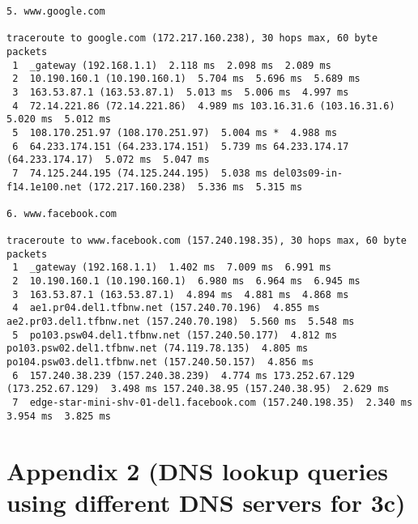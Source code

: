 \documentclass[a4paper]{article}
\begin{document}
\begin{enumerate}
\begin{lstlisting}
5. www.google.com

traceroute to google.com (172.217.160.238), 30 hops max, 60 byte packets
 1  _gateway (192.168.1.1)  2.118 ms  2.098 ms  2.089 ms
 2  10.190.160.1 (10.190.160.1)  5.704 ms  5.696 ms  5.689 ms
 3  163.53.87.1 (163.53.87.1)  5.013 ms  5.006 ms  4.997 ms
 4  72.14.221.86 (72.14.221.86)  4.989 ms 103.16.31.6 (103.16.31.6)  5.020 ms  5.012 ms
 5  108.170.251.97 (108.170.251.97)  5.004 ms *  4.988 ms
 6  64.233.174.151 (64.233.174.151)  5.739 ms 64.233.174.17 (64.233.174.17)  5.072 ms  5.047 ms
 7  74.125.244.195 (74.125.244.195)  5.038 ms del03s09-in-f14.1e100.net (172.217.160.238)  5.336 ms  5.315 ms

6. www.facebook.com

traceroute to www.facebook.com (157.240.198.35), 30 hops max, 60 byte packets
 1  _gateway (192.168.1.1)  1.402 ms  7.009 ms  6.991 ms
 2  10.190.160.1 (10.190.160.1)  6.980 ms  6.964 ms  6.945 ms
 3  163.53.87.1 (163.53.87.1)  4.894 ms  4.881 ms  4.868 ms
 4  ae1.pr04.del1.tfbnw.net (157.240.70.196)  4.855 ms ae2.pr03.del1.tfbnw.net (157.240.70.198)  5.560 ms  5.548 ms
 5  po103.psw04.del1.tfbnw.net (157.240.50.177)  4.812 ms po103.psw02.del1.tfbnw.net (74.119.78.135)  4.805 ms po104.psw03.del1.tfbnw.net (157.240.50.157)  4.856 ms
 6  157.240.38.239 (157.240.38.239)  4.774 ms 173.252.67.129 (173.252.67.129)  3.498 ms 157.240.38.95 (157.240.38.95)  2.629 ms
 7  edge-star-mini-shv-01-del1.facebook.com (157.240.198.35)  2.340 ms  3.954 ms  3.825 ms

        \end{lstlisting}

\end{enumerate}

\section{Appendix 2 (DNS lookup queries using different DNS servers for 3c)}
\end{document}

